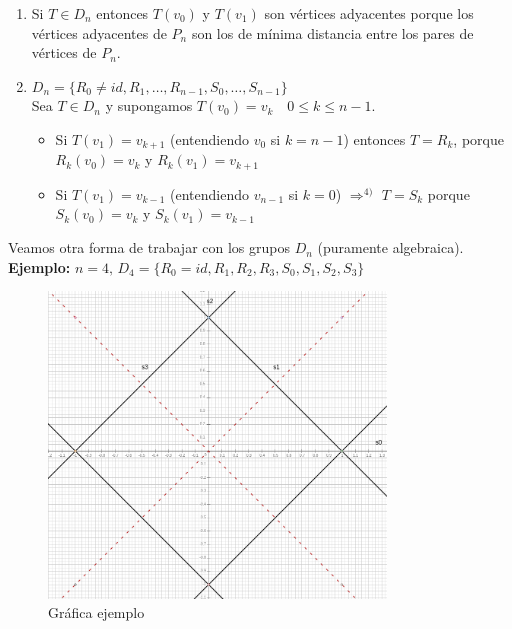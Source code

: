 \documentclass{article}
\begin{document}
\begin{enumerate}[(1)]
\item Si $T \in D_n$ entonces $T(v_0)$ y $T(v_1)$ son vértices adyacentes porque los vértices adyacentes de $P_n$ son los de mínima distancia entre los pares de vértices de $P_n$.

\item $D_n=\{R_0 \neq id, R_1, \ldots, R_{n-1}, S_0, \ldots, S_{n-1}\}$ \\

Sea $T\in D_n$ y supongamos $T(v_0)=v_k \quad 0\leq k \leq n-1$.

\begin{itemize}
\item Si $T (v_1)=v_{k+1}$ (entendiendo $v_0$ si $k=n-1$) entonces $T=R_k$, porque $R_k(v_0)=v_k$ y $R_k(v_1)=v_{k+1}$

\item Si $T(v_1)=v_{k-1}$ (entendiendo $v_{n-1}$ si $k=0$) $\Rightarrow^{4)}$ $T=S_k$ porque $S_k(v_0)=v_k$ y $S_k(v_1)=v_{k-1}$
\end{itemize}

\end{enumerate}

Veamos otra forma de trabajar con los grupos $D_n$ (puramente algebraica). \\

\textbf{Ejemplo:} $n=4,\, D_4=\{R_0=id, R_1, R_2, R_3, S_0, S_1, S_2, S_3\}$

\begin{figure}[h]
\centering
\caption{Gráfica ejemplo}
\includegraphics[scale=1,width=0.8\textwidth]{ejemplo_simetrias.png}
\end{figure}
\end{document}
